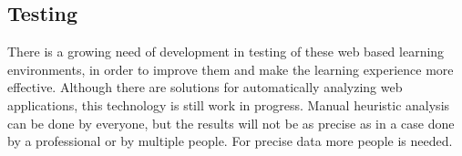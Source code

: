 \documentclass[10pt,english,a4paper]{article}
\begin{document}
\subsection*{Testing}
There is a growing need of development in testing of these web based learning environments, in order
to improve them and make the learning experience more effective.
Although there are solutions for automatically analyzing web applications, this technology is still work
in progress. Manual heuristic analysis can be done by everyone, but the results will not be as precise as
in a case done by a professional or by multiple people. For precise data more people is needed.






\end{document}
